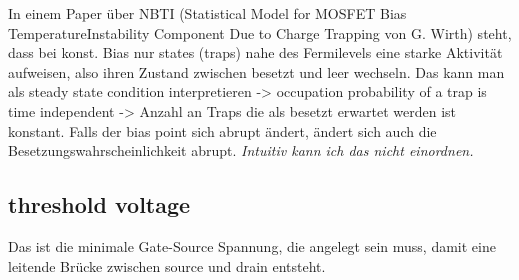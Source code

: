 \documentclass[paper=a4,10pt]{scrartcl}
\begin{document}
\noindent
In einem Paper über NBTI (Statistical Model for MOSFET Bias TemperatureInstability Component Due to Charge Trapping von G. Wirth) steht, dass bei konst. Bias nur states (traps) nahe des Fermilevels eine starke Aktivität aufweisen, also ihren Zustand zwischen besetzt und leer wechseln. Das kann man als steady state condition interpretieren -> occupation probability of a trap is time independent -> Anzahl an Traps die als besetzt erwartet werden ist konstant. Falls der bias point sich abrupt ändert, ändert sich auch die Besetzungswahrscheinlichkeit abrupt.
\textit{Intuitiv kann ich das nicht einordnen.}

\subsection{threshold voltage}
Das ist die minimale Gate-Source Spannung, die angelegt sein muss, damit eine leitende Brücke zwischen source und drain entsteht.
\end{document}
